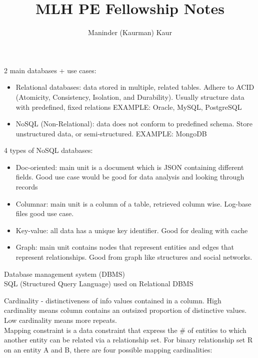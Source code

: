 \documentclass[11pt]{article}
\title{MLH PE Fellowship Notes}
\author{Maninder (Kaurman) Kaur}
\begin{document}
\maketitle

2 main databases + use cases:

\begin{itemize}
\item
  Relational databases: data stored in multiple, related tables. Adhere
  to ACID (Atomicity, Consistency, Isolation, and Durability). Usually
  structure data with predefined, fixed relations EXAMPLE: Oracle,
  MySQL, PostgreSQL\\
\item
  NoSQL (Non-Relational): data does not conform to predefined schema.
  Store unstructured data, or semi-structured. EXAMPLE: MongoDB
\end{itemize}

4 types of NoSQL databases:

\begin{itemize}
\item
  Doc-oriented: main unit is a document which is JSON containing
  different fields. Good use case would be good for data analysis and
  looking through records\\
\item
  Columnar: main unit is a column of a table, retrieved column wise.
  Log-base files good use case.\\
\item
  Key-value: all data has a unique key identifier. Good for dealing with
  cache\\
\item
  Graph: main unit contains nodes that represent entities and edges that
  represent relationships. Good from graph like structures and social
  networks.
\end{itemize}

Database management system (DBMS)\\
SQL (Structured Query Language) used on Relational DBMS

Cardinality - distinctiveness of info values contained in a column. High
cardinality means column contains an outsized proportion of distinctive
values. Low cardinality means more repeats.\\
Mapping constraint is a data constraint that express the \# of entities
to which another entity can be related via a relationship set. For
binary relationship set R on an entity A and B, there are four possible
mapping cardinalities:
\end{document}
